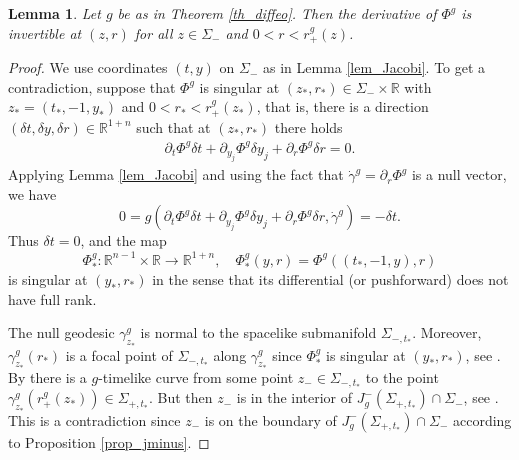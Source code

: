 \documentclass[11pt,letterpaper]{amsart}
\newtheorem{Lemma}[Theorem]{Lemma}
\theoremstyle{definition}
\numberwithin{equation}{section}
\newcommand{\p}{\partial}
\def\p{\partial}
\def\R{\mathbb R}
\begin{document}
\begin{Lemma}\label{lem_local_inv1}
Let $g$ be as in Theorem \ref{th_diffeo}.
Then the derivative of $\Phi^{g}$ is invertible at $(z,r)$ for all $z \in \Sigma_-$ and $0 < r < r_+^{g}(z)$.
\end{Lemma}
\begin{proof}
We use coordinates $(t,y)$ on $\Sigma_-$ as in Lemma \ref{lem_Jacobi}.
To get a contradiction, suppose that $\Phi^{g}$ is singular at $(z_*, r_*)  \in \Sigma_- \times \R$ 
with $z_* = (t_*, -1, y_*)$ and $0 < r_* < r_+^{g}(z_*)$, that is, 
there is a direction $(\delta t, \delta y, \delta r) \in \R^{1 + n}$ such that at $(z_*, r_*)$ there holds
    \begin{align*}%
\p_t \Phi^{g} \delta t + \p_{y_j} \Phi^{g} \delta y_j + \p_r \Phi^{g} \delta r = 0. 
    \end{align*}
Applying Lemma \ref{lem_Jacobi} and using the fact that $\dot \gamma^{g} = \p_r \Phi^{g}$ is a null vector, we have
\[
0 = g(\p_t \Phi^{g} \delta t + \p_{y_j} \Phi^{g} \delta y_j + \p_r \Phi^{g} \delta r, \dot \gamma^{g}) = -\delta t. 
\]
Thus $\delta t = 0$, and the map 
\[
\Phi_*^g :  \R^{n-1} \times \R \to \R^{1+n}, \quad \Phi_*^g(y,r) = \Phi^{g}((t_*, -1, y), r)
\]
is singular at $(y_*, r_*)$ in the sense that its differential (or pushforward) does not have full rank. 

The null geodesic $\gamma_{z_*}^g$ is normal to the spacelike submanifold $\Sigma_{-,t_*}$. 
Moreover, $\gamma_{z_*}^g(r_*)$ is a focal point of $\Sigma_{-,t_*}$ along $\gamma_{z_*}^g$ since $\Phi_*^g$ is singular at $(y_*, r_*)$, see \cite[Proposition 30, p.\ 283]{oneill1983}. By \cite[Proposition 48, p.\ 296]{oneill1983} there is a $g$-timelike curve from some point $z_- \in \Sigma_{-,t_*}$ to the point $\gamma_{z_*}^g(r_+^{g}(z_*)) \in \Sigma_{+,t_*}$.
But then $z_-$ is in the interior of $J_g^-(\Sigma_{+,t_*}) \cap \Sigma_-$, see \cite[Lemma 6, p.\ 404]{oneill1983}.
This is a contradiction since $z_-$ is on the boundary of $J_g^-(\Sigma_{+,t_*}) \cap \Sigma_-$ according to Proposition \ref{prop_jminus}.
\end{proof}
\end{document}
